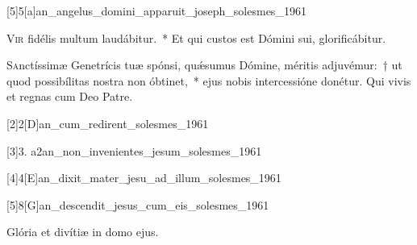 \documentclass[vesperale_romanum.tex]{subfiles}
\begin{document}
[5]{5}[a]{an_angelus_domini_apparuit_joseph_solesmes_1961}

\label{cap_19_mar}

\lettrine{V}{ir} fidélis multum laudábitur.~* Et qui custos est Dómini sui, glorificábitur.

\hymnus

\label{hy_te_joseph_celebrent_solesmes}





\label{or_19_mar}

\oratio
\lettrine{S}{a}nctíssimæ Genetrícis tuæ spónsi, quǽsumus Dómine, méritis adjuvémur:~† ut quod possibílitas nostra non óbtinet,~* ejus nobis intercessióne donétur.
Qui vivis et regnas cum Deo Patre.

\commferiae

\newpage



[2]{2}[D]{an_cum_redirent_solesmes_1961}


[3]{3. a2}{an_non_invenientes_jesum_solesmes_1961}


[4]{4}[E]{an_dixit_mater_jesu_ad_illum_solesmes_1961}


[5]{8}[G]{an_descendit_jesus_cum_eis_solesmes_1961}


\vv Glória et divítiæ in domo ejus.
\end{document}
